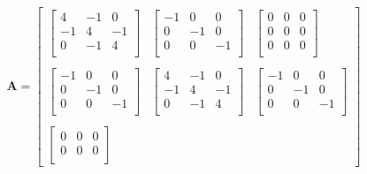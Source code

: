 \documentclass[12pt]{article}
\begin{document}
    \[
        \mathbf{A} = 
        \begin{bmatrix}
            \begin{bmatrix}
                4  & -1 & 0 \\
                -1 & 4  & -1\\
                0  & -1 & 4 \\
            \end{bmatrix}
            &
            \begin{bmatrix}
                -1 & 0  & 0 \\
                0  & -1 & 0 \\
                0  & 0  & -1\\
            \end{bmatrix}
            &
            \begin{bmatrix}
                0 & 0 & 0 \\
                0 & 0 & 0 \\
                0 & 0 & 0\\
            \end{bmatrix}
            \\
            \\
            \begin{bmatrix}
                -1 & 0  & 0 \\
                0  & -1 & 0 \\
                0  & 0  & -1\\
            \end{bmatrix}
            &
            \begin{bmatrix}
                4  & -1 & 0 \\
                -1 & 4  & -1\\
                0  & -1 & 4 \\
            \end{bmatrix}
            &
            \begin{bmatrix}
                -1 & 0  & 0 \\
                0  & -1 & 0 \\
                0  & 0  & -1\\
            \end{bmatrix}
            \\
            \\
            \begin{bmatrix}
                0 & 0 & 0 \\
                0 & 0 & 0 \\

\end{bmatrix}
\end{bmatrix}\]
\end{document}
